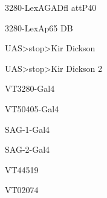 \documentclass[17pt]{extarticle}
\begin{document}
\footnotesize
\newpage\vspace*{-0.15cm}
\begin{footnotesize}
3280-LexAGADfl attP40 \\[0.5em]
\end{footnotesize}
\footnotesize
\newpage\vspace*{-0.15cm}
\begin{normalsize}
3280-LexAp65 DB \\[0.5em]
\end{normalsize}
\footnotesize
\newpage\vspace*{-0.15cm}
\begin{footnotesize}
UAS>stop>Kir Dickson \\[0.5em]
\end{footnotesize}
\footnotesize
\newpage\vspace*{-0.15cm}
\begin{footnotesize}
UAS>stop>Kir Dickson 2 \\[0.5em]
\end{footnotesize}
\footnotesize
\newpage\vspace*{-0.15cm}
\begin{normalsize}
VT3280-Gal4 \\[0.5em]
\end{normalsize}
\footnotesize
\newpage\vspace*{-0.15cm}
\begin{normalsize}
VT50405-Gal4 \\[0.5em]
\end{normalsize}
\footnotesize
\newpage\vspace*{-0.15cm}
\begin{large}
SAG-1-Gal4 \\[0.5em]
\end{large}
\footnotesize
\newpage\vspace*{-0.15cm}
\begin{large}
SAG-2-Gal4 \\[0.5em]
\end{large}
\footnotesize
\newpage\vspace*{-0.15cm}
\begin{large}
VT44519 \\[0.5em]
\end{large}
\footnotesize
\newpage\vspace*{-0.15cm}
\begin{large}
VT02074 \\[0.5em]
\end{large}
\footnotesize
\newpage\vspace*{-0.15cm}
\end{document}
